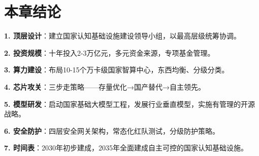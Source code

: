 \section{本章结论}

\textbf{1. 顶层设计}：建立国家认知基础设施建设领导小组，以最高层级统筹协调。

\textbf{2. 投资规模}：十年投入2-3万亿元，多元资金来源，专项基金管理。

\textbf{3. 算力建设}：布局10-15个万卡级国家智算中心，东西均衡、分级分类。

\textbf{4. 芯片攻关}：三步走策略——存量优化→国产替代→自主领先。

\textbf{5. 模型研发}：启动国家基础大模型工程，发展行业垂直模型，实施有管理的开源战略。

\textbf{6. 安全防护}：四层安全网关架构，常态化红队测试，分级防护策略。

\textbf{7. 时间表}：2030年初步建成，2035年全面建成自主可控的国家认知基础设施。

